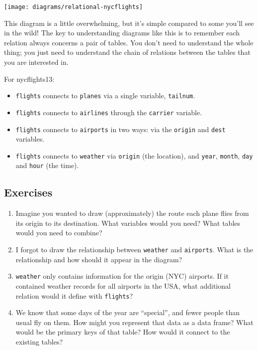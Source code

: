 \documentclass[]{book}
\begin{document}
\begin{center}\texttt{[image: diagrams/relational-nycflights]} \end{center}

This diagram is a little overwhelming, but it's simple compared to some
you'll see in the wild! The key to understanding diagrams like this is
to remember each relation always concerns a pair of tables. You don't
need to understand the whole thing; you just need to understand the
chain of relations between the tables that you are interested in.

For nycflights13:

\begin{itemize}
\item
  \texttt{flights} connects to \texttt{planes} via a single variable,
  \texttt{tailnum}.
\item
  \texttt{flights} connects to \texttt{airlines} through the
  \texttt{carrier} variable.
\item
  \texttt{flights} connects to \texttt{airports} in two ways: via the
  \texttt{origin} and \texttt{dest} variables.
\item
  \texttt{flights} connects to \texttt{weather} via \texttt{origin} (the
  location), and \texttt{year}, \texttt{month}, \texttt{day} and
  \texttt{hour} (the time).
\end{itemize}

\subsection{Exercises}\label{exercises-26}

\begin{enumerate}
\def\labelenumi{\arabic{enumi}.}
\item
  Imagine you wanted to draw (approximately) the route each plane flies
  from its origin to its destination. What variables would you need?
  What tables would you need to combine?
\item
  I forgot to draw the relationship between \texttt{weather} and
  \texttt{airports}. What is the relationship and how should it appear
  in the diagram?
\item
  \texttt{weather} only contains information for the origin (NYC)
  airports. If it contained weather records for all airports in the USA,
  what additional relation would it define with \texttt{flights}?
\item
  We know that some days of the year are ``special'', and fewer people
  than usual fly on them. How might you represent that data as a data
  frame? What would be the primary keys of that table? How would it
  connect to the existing tables?
\end{enumerate}
\end{document}
